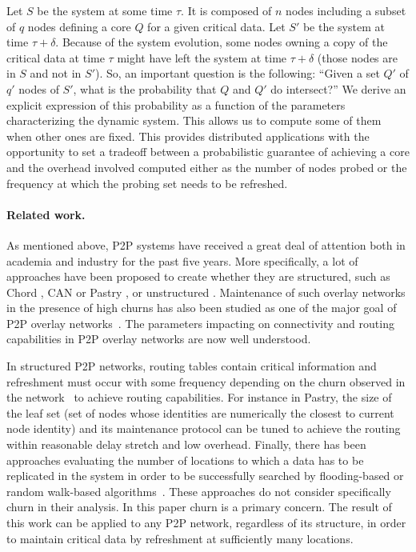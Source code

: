 \documentclass[]{llncs}
\begin{document}
Let $S$ be the system at some time $\tau$. It is composed of 
$n$ nodes including a subset of $q$ nodes defining a core $Q$ for a 
given critical data.  Let $S'$ be the system at time $\tau+\delta$.
Because of the system evolution, 
some nodes owning a copy of the  critical data at time $\tau$ might have
left the system at time $\tau+\delta$ (those nodes are in $S$ and not in
$S'$).  So, an important question is the following: 
``Given a set  $Q'$ of $q'$  nodes of $S'$,  what is the probability that
$Q$ and $Q'$ do intersect?'' We derive an explicit expression of this probability as a function of
the parameters characterizing the dynamic system.
This allows us to  compute some  of them
when other ones are fixed. 
This provides distributed 
applications with the opportunity to set a tradeoff between a probabilistic 
guarantee of achieving a core  and the overhead involved computed either 
as the number of nodes probed or the frequency at which the probing set needs
to be refreshed.

\paragraph{Related work.}
As mentioned above, P2P systems have received a great deal of
attention both in academia  
and  industry  for  the  past  five  years. More  specifically,  a  lot  of
approaches have been proposed to  
create whether they are structured,  such as Chord \cite{stoica.i2001}, CAN
\cite{ratnasamy.s2001}  or Pastry  \cite{rowstron.a2001c},  or unstructured
\cite{lpbcast,ganesh.a2003,JGKvS04}. Maintenance of such overlay networks
in the presence of high churns has also been studied as one
of the  major goal of P2P overlay networks~\cite{LBK02}.  The parameters 
impacting on connectivity and routing capabilities in P2P overlay networks  
are now well understood. 

In structured  P2P networks, routing tables contain critical information
and refreshment must occur with some frequency depending on the churn 
observed in the  network~\cite{castro2004} to achieve routing 
capabilities.
For instance in Pastry, the  size of the leaf set (set of nodes whose 
identities are numerically the closest to current node identity) and its 
maintenance protocol can be tuned to achieve the routing within reasonable  
delay stretch and low overhead.
Finally, there has been approaches evaluating the number of locations
to which a data has to be replicated
in the  system in  order to be  successfully searched by  flooding-based or
random walk-based algorithms~\cite{cohen2002}.  These approaches do 
not consider specifically churn in their analysis. 
In this paper churn is a primary concern.  The result of this work can
be applied to any P2P network, regardless of its structure, in order
to maintain critical data by refreshment at sufficiently many locations.
\end{document}
